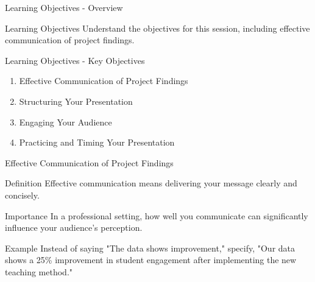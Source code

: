 \documentclass[aspectratio=169]{beamer}
\begin{document}
\begin{frame}[fragile]{Learning Objectives - Overview}
    \begin{block}{Learning Objectives}
        Understand the objectives for this session, including effective communication of project findings.
    \end{block}
\end{frame}

\begin{frame}[fragile]{Learning Objectives - Key Objectives}
    \begin{enumerate}
        \item Effective Communication of Project Findings
        \item Structuring Your Presentation
        \item Engaging Your Audience
        \item Practicing and Timing Your Presentation
    \end{enumerate}
\end{frame}

\begin{frame}[fragile]{Effective Communication of Project Findings}
    \begin{block}{Definition}
        Effective communication means delivering your message clearly and concisely.
    \end{block}
    \begin{block}{Importance}
        In a professional setting, how well you communicate can significantly influence your audience's perception.
    \end{block}
    \begin{block}{Example}
        Instead of saying "The data shows improvement," specify, "Our data shows a 25\% improvement in student engagement after implementing the new teaching method."
    \end{block}
\end{frame}
\end{document}
